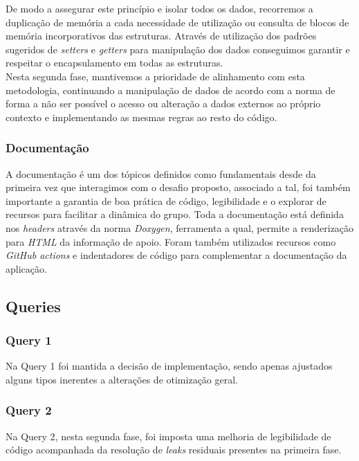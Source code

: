 \documentclass[12pt,a4paper]{article}
\begin{document}
    De modo a assegurar este princípio e isolar todos os dados, recorremos a duplicação de memória a cada necessidade de utilização ou consulta de blocos de memória incorporativos das estruturas. Através de utilização dos padrões sugeridos de \textit{setters} e \textit{getters} para manipulação dos dados conseguimos garantir e respeitar o encapsulamento em todas as estruturas. \\

    Nesta segunda fase, mantivemos a prioridade de alinhamento com esta metodologia, continuando a manipulação de dados de acordo com a norma de forma a não ser possível o acesso ou alteração a dados externos ao próprio contexto e implementando as mesmas regras ao resto do código.
    
    \subsubsection{Documentação}
    \hspace{0.6cm} A documentação é um dos tópicos definidos como fundamentais desde da primeira vez que interagimos com o desafio proposto, associado a tal, foi também importante a garantia de boa prática de código, legibilidade e o explorar de recursos para facilitar a dinâmica do grupo. Toda a documentação está definida nos \textit{headers} através da norma \textit{Doxygen}, ferramenta a qual, permite a renderização para \textit{HTML} da informação de apoio. Foram também utilizados recursos como \textit{GitHub actions} e indentadores de código para complementar a documentação da aplicação.

    
    \subsection{Queries}
    \subsubsection{Query 1}
    \hspace{0,6cm}Na Query 1 foi mantida a decisão de implementação, sendo apenas ajustados alguns tipos inerentes a alterações de otimização geral.
    
    \subsubsection{Query 2}
    \hspace{0,6cm}Na Query 2, nesta segunda fase, foi imposta uma melhoria de legibilidade de código acompanhada da resolução de \textit{leaks} residuais presentes na primeira fase.
\end{document}

